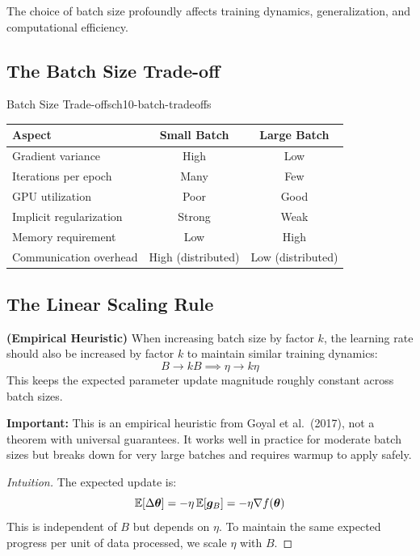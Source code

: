 \documentclass[../../main.tex]{subfiles}
\begin{document}
The choice of batch size profoundly affects training dynamics, generalization, and computational efficiency.

\subsection{The Batch Size Trade-off}

\begin{definition}{Batch Size Trade-offs}{ch10-batch-tradeoffs}
\begin{center}
\begin{tabular}{lcc}
\toprule
\textbf{Aspect} & \textbf{Small Batch} & \textbf{Large Batch} \\
\midrule
Gradient variance & High & Low \\
Iterations per epoch & Many & Few \\
GPU utilization & Poor & Good \\
Implicit regularization\index{implicit regularization} & Strong & Weak \\
Memory requirement & Low & High \\
Communication overhead\index{distributed training} & High (distributed) & Low (distributed) \\
\bottomrule
\end{tabular}
\end{center}
\end{definition}

\subsection{The Linear Scaling Rule}

\begin{principle}[title=Linear Scaling Rule]
\textbf{(Empirical Heuristic)} When increasing batch size by factor $k$, the learning rate should also be increased by factor $k$ to maintain similar training dynamics:
\[
    B \to kB \implies \eta \to k\eta
\]
This keeps the expected parameter update magnitude roughly constant across batch sizes.

\textbf{Important:} This is an empirical heuristic from Goyal et al.\ (2017), not a theorem with universal guarantees. It works well in practice for moderate batch sizes but breaks down for very large batches and requires warmup to apply safely.
\end{principle}

\begin{proof}[Intuition]
The expected update is:
\[
    \operatorname{\mathbb{E}}[\Delta \boldsymbol{\theta}] = -\eta \operatorname{\mathbb{E}}[\boldsymbol{g}_B] = -\eta \nabla f(\boldsymbol{\theta})
\]
This is independent of $B$ but depends on $\eta$. To maintain the same expected progress per unit of data processed, we scale $\eta$ with $B$.
\end{proof}
\end{document}

